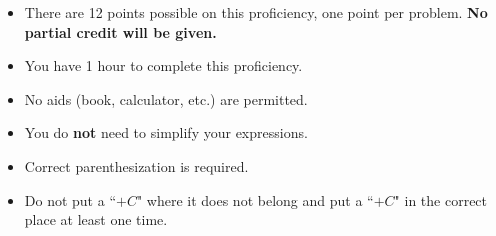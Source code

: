 \documentclass[12pt]{article}
\begin{document}
\begin{itemize}
\addtolength\itemsep{-1mm}
\item There are 12 points possible on this proficiency, one point per problem. {\bf No partial credit will be given.}

\item You have 1 hour to complete this proficiency.

\item No aids (book, calculator, etc.) are permitted.  

\item You do \textbf{not} need to simplify your expressions.

\item Correct parenthesization is required.

\item Do not put a ``$+C$\:" where it does not belong and put a ``$+C$\:" in the correct place at least one time.




\end{itemize}
\end{document}
